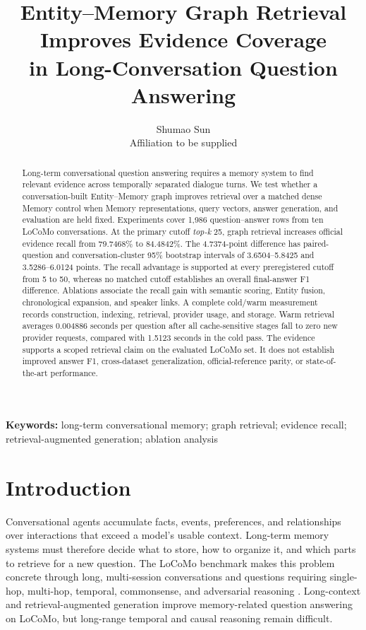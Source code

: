 \documentclass[10pt,twocolumn]{article}
\title{\textbf{Entity--Memory Graph Retrieval Improves Evidence Coverage\\
in Long-Conversation Question Answering}}
\author{Shumao Sun\\
\small Affiliation to be supplied}
\date{}
\newcommand{\topk}{\textit{top-k}}
\begin{document}
\maketitle

\begin{abstract}
Long-term conversational question answering requires a memory system to find
relevant evidence across temporally separated dialogue turns. We test whether
a conversation-built Entity--Memory graph improves retrieval over a matched
dense Memory control when Memory representations, query vectors, answer
generation, and evaluation are held fixed. Experiments cover 1,986
question--answer rows from ten LoCoMo conversations. At the primary cutoff
\topk{} 25, graph retrieval increases official evidence recall from 79.7468\%
to 84.4842\%. The 4.7374-point difference has paired-question and
conversation-cluster 95\% bootstrap intervals of 3.6504--5.8425 and
3.5286--6.0124 points. The recall advantage is supported at every
preregistered cutoff from 5 to 50, whereas no matched cutoff establishes an
overall final-answer F1 difference. Ablations associate the recall gain with
semantic scoring, Entity fusion, chronological expansion, and speaker links.
A complete cold/warm measurement records construction, indexing, retrieval,
provider usage, and storage. Warm retrieval averages 0.004886 seconds per
question after all cache-sensitive stages fall to zero new provider requests,
compared with 1.5123 seconds in the cold pass. The evidence supports a scoped
retrieval claim on the evaluated LoCoMo set. It does not establish improved
answer F1, cross-dataset generalization, official-reference parity, or
state-of-the-art performance.
\end{abstract}

\noindent\textbf{Keywords:} long-term conversational memory; graph retrieval;
evidence recall; retrieval-augmented generation; ablation analysis

\section{Introduction}

Conversational agents accumulate facts, events, preferences, and relationships
over interactions that exceed a model's usable context. Long-term memory
systems must therefore decide what to store, how to organize it, and which
parts to retrieve for a new question. The LoCoMo benchmark makes this problem
concrete through long, multi-session conversations and questions requiring
single-hop, multi-hop, temporal, commonsense, and adversarial reasoning
\citep{maharana2024locomo}. Long-context and retrieval-augmented generation
improve memory-related question answering on LoCoMo, but long-range temporal
and causal reasoning remain difficult.
\end{document}
